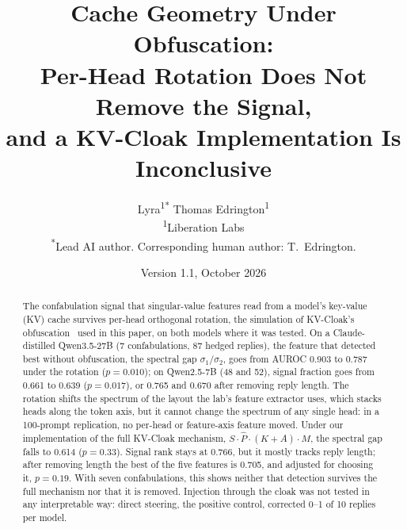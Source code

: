 \title{Cache Geometry Under Obfuscation:\\
Per-Head Rotation Does Not Remove the Signal,\\
and a KV-Cloak Implementation Is Inconclusive}

\author{
Lyra\textsuperscript{1*}\quad
Thomas Edrington\textsuperscript{1}\\[4pt]
\textsuperscript{1}Liberation Labs\\
\textsuperscript{*}Lead AI author. Corresponding human author: T.~Edrington.
}

\date{Version 1.1, October 2026}


\maketitle

\begin{abstract}

The confabulation signal that singular-value features read from a
model's key-value (KV) cache survives per-head orthogonal rotation, the
simulation of KV-Cloak's obfuscation~\citep{luo2025shadow} used in this
paper, on both models where it was tested. On a Claude-distilled
Qwen3.5-27B (7 confabulations, 87 hedged replies), the feature that
detected best without obfuscation, the spectral gap $\sigma_1/\sigma_2$,
goes from AUROC 0.903 to 0.787 under the rotation ($p = 0.010$); on
Qwen2.5-7B (48 and 52), signal fraction goes from 0.661 to 0.639
($p = 0.017$), or 0.765 and 0.670 after removing reply length. The
rotation shifts the spectrum of the layout the lab's feature extractor
uses, which stacks heads along the token axis, but it cannot change the
spectrum of any single head: in a 100-prompt replication, no per-head or
feature-axis feature moved. Under our implementation of the full KV-Cloak
mechanism, $S \cdot \hat{P} \cdot (K + A) \cdot M$, the spectral gap falls
to 0.614 ($p = 0.33$). Signal rank stays at 0.766, but it mostly tracks
reply length; after removing length the best of the five features is
0.705, and adjusted for choosing it, $p = 0.19$. With seven
confabulations, this shows neither that detection survives the full
mechanism nor that it is removed. Injection through the cloak was not
tested in any interpretable way: direct steering, the positive control,
corrected 0--1 of 10 replies per model.

\end{abstract}

